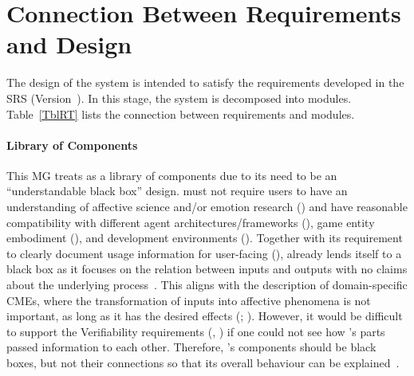 \section{Connection Between Requirements and Design} \label{SecConnection}

The design of the system is intended to satisfy the requirements developed in
the SRS (Version~\srsVersion). In this stage, the system is decomposed into
modules. Table~\ref{TblRT} lists the connection between requirements and
modules.

\paragraph{Library of Components}
This MG treats \progname{} as a library of components due to its need to be an
``understandable black box'' design. \progname{} must not require users to have
an understanding of affective science and/or emotion research
() and have reasonable compatibility with different agent
architectures/frameworks (), game entity embodiment
(), and development environments (). Together with
its requirement to clearly document usage information for user-facing
(), \progname{} already lends itself to a black box as it
focuses on the relation between inputs and outputs with no claims about the
underlying process~\citep[p.~601]{wehrle1995potential}. This aligns with the
description of domain-specific CMEs, where the transformation of inputs into
affective phenomena is not important, as long as it has the desired effects
(;
). However, it would be difficult to
support the Verifiability requirements (, ) if
one could not see how \progname{}'s parts passed information to each other.
Therefore, \progname{}'s components should be black boxes, but not their
connections so that its overall behaviour can be
explained~\citep[p.~20]{guimaraes2022fatima}.

